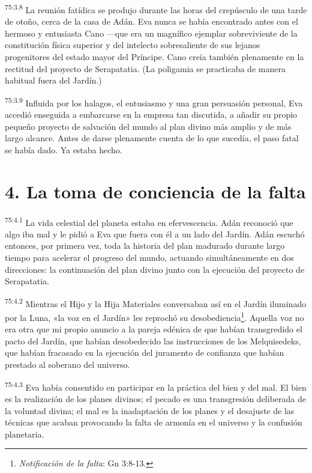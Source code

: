 \par
\textsuperscript{75:3.8} La reunión fatídica se produjo durante las horas del crepúsculo de una tarde de otoño, cerca de la casa de Adán. Eva nunca se había encontrado antes con el hermoso y entusiasta Cano ---que era un magnífico ejemplar sobreviviente de la constitución física superior y del intelecto sobresaliente de sus lejanos progenitores del estado mayor del Príncipe. Cano creía también plenamente en la rectitud del proyecto de Serapatatia. (La poligamia se practicaba de manera habitual fuera del Jardín.)

\par
\textsuperscript{75:3.9} Influida por los halagos, el entusiasmo y una gran persuasión personal, Eva accedió enseguida a embarcarse en la empresa tan discutida, a añadir su propio pequeño proyecto de salvación del mundo al plan divino más amplio y de más largo alcance. Antes de darse plenamente cuenta de lo que sucedía, el paso fatal se había dado. Ya estaba hecho.

\section*{4. La toma de conciencia de la falta}
\par
\textsuperscript{75:4.1} La vida celestial del planeta estaba en efervescencia. Adán reconoció que algo iba mal y le pidió a Eva que fuera con él a un lado del Jardín. Adán escuchó entonces, por primera vez, toda la historia del plan madurado durante largo tiempo para acelerar el progreso del mundo, actuando simultáneamente en dos direcciones: la continuación del plan divino junto con la ejecución del proyecto de Serapatatia.

\par
\textsuperscript{75:4.2} Mientras el Hijo y la Hija Materiales conversaban así en el Jardín iluminado por la Luna, «la voz en el Jardín» les reprochó su desobediencia\footnote{\textit{Notificación de la falta}: Gn 3:8-13.}. Aquella voz no era otra que mi propio anuncio a la pareja edénica de que habían transgredido el pacto del Jardín, que habían desobedecido las instrucciones de los Melquisedeks, que habían fracasado en la ejecución del juramento de confianza que habían prestado al soberano del universo.

\par
\textsuperscript{75:4.3} Eva había consentido en participar en la práctica del bien y del mal. El bien es la realización de los planes divinos; el pecado es una transgresión deliberada de la voluntad divina; el mal es la inadaptación de los planes y el desajuste de las técnicas que acaban provocando la falta de armonía en el universo y la confusión planetaria.

